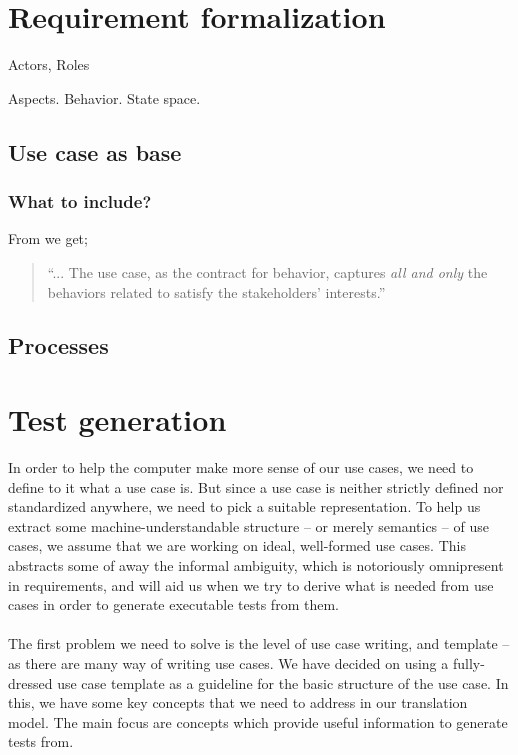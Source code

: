\chapter{Requirement formalization}
Actors, Roles

Aspects. Behavior. State space.

\section{Use case as base}

\subsection{What to include?}
From \cite{Cockburn:2000:WEU:517669} we get;
\begin{quote}
``... The use case, as the contract for behavior, captures \emph{all and only} the behaviors related to satisfy the stakeholders’ interests.''
\end{quote}

\section{Processes}

\chapter{Test generation}
In order to help the computer make more sense of our use cases, we need to define to it what a use case is. But since a use case is neither strictly defined nor standardized anywhere, we need to pick a suitable representation.
To help us extract some machine-understandable structure -- or merely semantics -- of use cases, we assume that we are working on ideal, well-formed use cases. This abstracts some of away the informal ambiguity, which is notoriously omnipresent in requirements, and will aid us when we try to derive what is needed from use cases in order to generate executable tests from them.\\\\
The first problem we need to solve is the level of use case writing, and template -- as there are many way of writing use cases. 
We have decided on using a fully-dressed use case template\cite{larman2005applying} as a guideline for the basic structure of the use case. In this, we have some key concepts that we need to address in our translation model. The main focus are concepts which provide useful information to generate tests from.

